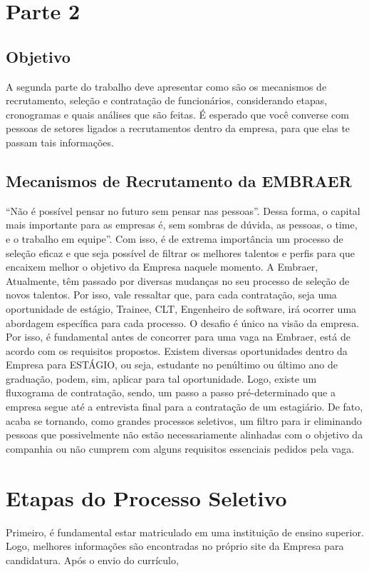 \chapter{Parte 2}
\section{Objetivo}
A segunda parte do trabalho deve apresentar como são os mecanismos de recrutamento, seleção e contratação de funcionários, considerando etapas, cronogramas e quais análises que são feitas. É esperado que você converse com pessoas de setores ligados a recrutamentos dentro da empresa, para que elas te passam tais informações. 



\section{Mecanismos de Recrutamento da EMBRAER}
“Não é possível pensar no futuro sem pensar nas pessoas”. Dessa forma, o capital mais importante para as empresas é, sem sombras de dúvida, as pessoas, o time, e o trabalho em equipe”. Com isso, é de extrema importância um processo de seleção eficaz e que seja possível de filtrar os melhores talentos e perfis para que encaixem melhor o objetivo da Empresa naquele momento. 
A Embraer, Atualmente, têm passado por diversas mudanças no seu processo de seleção de novos talentos. Por isso, vale ressaltar que, para cada contratação, seja uma oportunidade de  estágio, Trainee, CLT, Engenheiro de software, irá ocorrer uma abordagem específica para cada processo. O desafio é único na visão da empresa. Por isso, é fundamental antes de concorrer para uma vaga na Embraer, está de acordo com os requisitos propostos. Existem diversas oportunidades dentro da Empresa para ESTÁGIO, ou seja, estudante no penúltimo ou último ano de graduação, podem, sim, aplicar para tal oportunidade. Logo, existe um fluxograma de contratação, sendo, um passo a passo pré-determinado que a empresa segue até a entrevista final para a contratação de um estagiário. De fato, acaba se tornando, como grandes processos seletivos, um filtro para ir eliminando pessoas que possivelmente não estão necessariamente alinhadas com o objetivo da companhia ou  não cumprem com alguns requisitos essenciais pedidos pela vaga. 

\chapter{Etapas do Processo Seletivo}
Primeiro, é fundamental estar matriculado em uma instituição de ensino superior. Logo, melhores informações são encontradas no próprio site da Empresa para candidatura. Após o envio do currículo,

